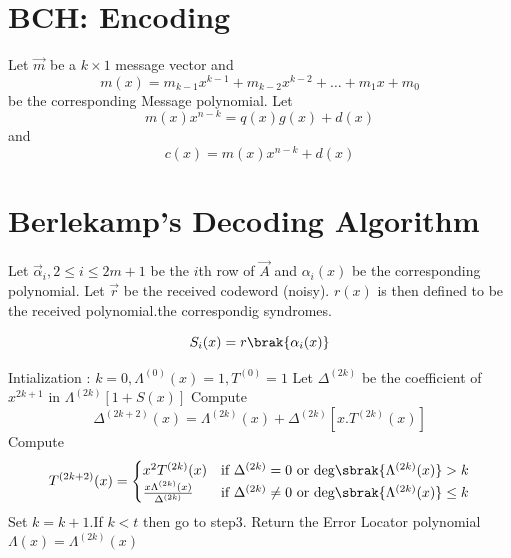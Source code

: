 \documentclass[journal,12pt,twocolumn]{IEEEtran}
\renewcommand\thesection{\arabic{section}}
\begin{document}
\section{BCH: Encoding}
 Let $\vec{m}$ be a $k \times 1$ message vector and  
\begin{equation}
m(x)=m_{k-1}x^{k-1}+m_{k-2}x^{k-2}+\dots+m_1x+m_0
\end{equation} 
be the  corresponding Message polynomial. 
Let 
\begin{equation}
m(x)x^{n-k} = q(x)g(x)+d(x)
\end{equation} 
and 
\begin{equation}
c(x)=m(x)x^{n-k}+d(x)
\end{equation}
%

\section{Berlekamp's Decoding Algorithm}

Let $\vec{\alpha}_i, 2 \le i \le 2m+1$ be the $i$th row of $\vec{A}$ and $\alpha_i(x)$ be the
corresponding polynomial. Let $\vec{r}$ be the received codeword (noisy). $r(x)$ is then defined to be the 
received polynomial.the correspondig syndromes. 

\begin{equation}
S_i(x) = r\brak{\alpha_i(x)}
\end{equation}

 Intialization : $k=0, \Lambda^{(0)}(x)=1,T^{(0)}=1$
 Let $\Delta^{(2k)}$ be the coefficient of $x^{2k+1}$ in $\Lambda^{(2k)}[1+S(x)]$ 
 Compute  
\begin{equation}
\Delta^{(2k+2)}(x)=\Lambda^{(2k)}(x) +\Delta^{(2k)}[x.T^{(2k)}(x)]
\end{equation}
 Compute \begin{equation}
    	T^{(2k+2)}(x) =
    \begin{cases}
    	x^2T^{(2k)}(x) & \text{if $\Delta^{(2k)}=0$ or deg}\sbrak{\Lambda^{(2k)}(x)}>k\\
      \frac{x \Lambda^{(2k)}(x)}{\Delta^{(2k)}} & \text{if $\Delta^{(2k)}\neq 0$ or 
deg}\sbrak{\Lambda^{(2k)}(x)}\leq k
    \end{cases}
  \end{equation}
 Set $k=k+1$.If $k<t$ then go to step3.
 Return the Error Locator polynomial $\Lambda(x)=\Lambda^{(2k)}(x)$
\end{document}
